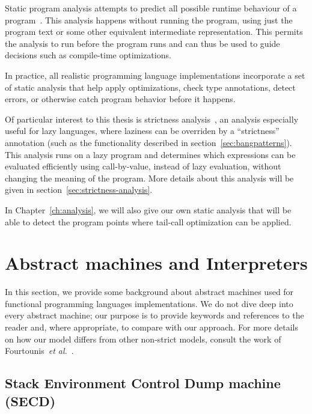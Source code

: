 \documentclass[diploma]{softlab-thesis}
\begin{document}
Static program analysis attempts to predict all possible runtime
behaviour of a program~\cite{Nielson:2010:PPA:1965094}. This analysis
happens without running the program, using just the program text or
some other equivalent intermediate representation. This permits the analysis to
run before the program runs and can thus be used to guide decisions
such as compile-time optimizations.

In practice, all realistic programming language implementations
incorporate a set of static analysis that help apply optimizations,
check type annotations, detect errors, or otherwise catch program
behavior before it happens.

Of particular interest to this thesis is strictness
analysis~\cite{PeytonJones:1991:UVF:645420.652528,Holdermans:2010:MSM:2088270.2088274},
an analysis especially useful for lazy languages, where laziness can
be overriden by a ``strictness'' annotation (such as the functionality
described in section~\ref{sec:bangpatterns}). This analysis runs on a
lazy program and determines which expressions can be evaluated
efficiently using call-by-value, instead of lazy evaluation, without
changing the meaning of the program. More details about this analysis will be given in section~\ref{sec:strictness-analysis}.


In Chapter~\ref{ch:analysis}, we will also give our own static
analysis that will be able to detect the program points where
tail-call optimization can be applied.

\section{Abstract machines and Interpreters}
\label{sec:abstract-machines}

In this section, we provide some background about abstract machines
used for functional programming languages implementations.  We do not
dive deep into every abstract machine; our purpose is to provide
keywords and references to the reader and, where appropriate, to
compare with our approach. For more details on how our model differs
from other non-strict models, consult the work of
Fourtounis~\emph{et al.}~\cite{Fourtounis:2013:GIT:2769663.2769674,Fourtounis14}.

\subsection {Stack Environment Control Dump machine (SECD)}
\label{sec:secd}
\end{document}
